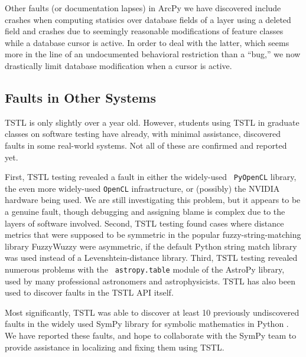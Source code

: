 Other faults (or documentation lapses) in ArcPy we have discovered include crashes when computing
statisics over database fields of a layer using a deleted field and
crashes due to seemingly reasonable modifications of feature classes
while a database cursor is active.  In order to deal with the latter,
which seems more in the line of an undocumented behavioral restriction
than a ``bug,'' we now drastically limit database modification when a cursor is active.

\subsection{Faults in Other Systems}

TSTL  is only slightly over a year old.  However, students using
TSTL in graduate classes on software testing have already, with
minimal assistance, discovered faults in some real-world systems.  Not
all of these are confirmed and reported yet.

First, TSTL testing revealed a fault in either the widely-used {\tt
  PyOpenCL} library, the even more widely-used {\tt OpenCL}
infrastructure, or (possibly) the NVIDIA hardware being used.  We are
still investigating this problem, but it appears to be a genuine
fault, though debugging and assigning blame is complex due to the
layers of software involved.  Second, TSTL testing found cases where distance metrics that were supposed to
be symmetric in the popular fuzzy-string-matching library FuzzyWuzzy
were asymmetric, if the default Python string match library was used
instead of a Levenshtein-distance library.
Third, TSTL testing revealed numerous problems with the {\tt
  astropy.table} module of the AstroPy
library, used by many professional astronomers and astrophysicists.
TSTL has also been used to discover faults in the TSTL API itself.

Most significantly, TSTL was able to discover at least 10
previously undiscovered faults in the widely used SymPy library for
symbolic mathematics in Python \cite{sympy}.  We have reported these
faults, and hope to collaborate with the SymPy team to provide
assistance in localizing and fixing them using TSTL.